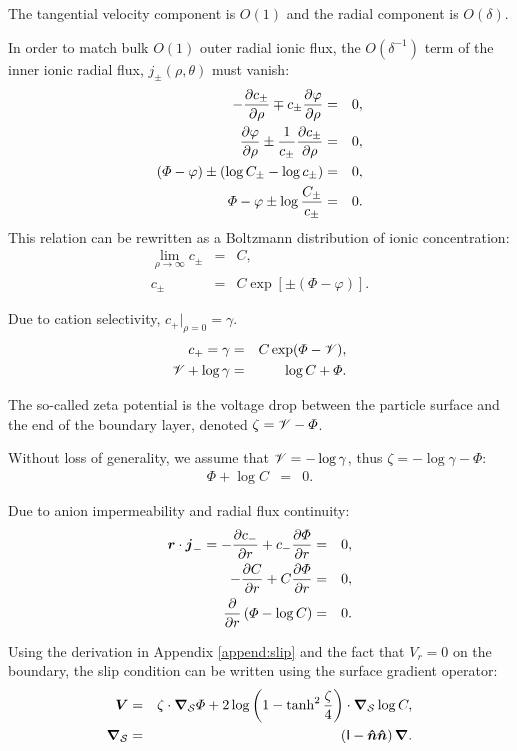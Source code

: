 The tangential velocity component is $O(1)$ and the radial component is $O(\delta)$.

In order to match bulk $O(1)$ outer radial ionic flux, 
the $O(\delta^{-1})$ term of the inner ionic radial flux, $j_\pm(\rho, \theta)$ must vanish:
\begin{eqnarray}
  -\frac{\partial c_\pm}{\partial \rho} \mp c_\pm \frac{\partial \varphi}{\partial \rho} &=& 0, \\
  \frac{\partial \varphi}{\partial \rho} \pm\frac{1}{c_\pm}\frac{\partial c_\pm}{\partial \rho} &=& 0, \\
  \left(\varPhi - \varphi\right) \pm\left(\log C_\pm - \log c_\pm\right) &=& 0, \\
  \varPhi - \varphi \pm \log \frac{C_\pm}{c_\pm} &=& 0.
\end{eqnarray}
This relation can be rewritten as a Boltzmann distribution of ionic concentration:
\begin{eqnarray}
\lim_{\rho\rightarrow\infty} c_\pm &=& C, \\
c_\pm &=& C \exp\left[\pm(\varPhi - \varphi)\right].
\end{eqnarray}

Due to cation selectivity, $c_+|_{\rho=0} = \gamma$.
\begin{eqnarray}
  c_+ = \gamma &=& C \exp(\varPhi - \mathscr{V}), \\
  \mathscr{V} + \log \gamma &=& \log C + \varPhi.
\end{eqnarray}

The so-called zeta potential is 
the voltage drop between the particle surface and the end of
the boundary layer, denoted $\zeta = \mathscr{V} - \varPhi$. 

Without loss of generality, 
we assume that $\mathscr{V} = -\log\gamma$, thus $\zeta = -\log\gamma-\varPhi$:
\begin{eqnarray}
\varPhi + \log C &=& 0.
\end{eqnarray}

Due to anion impermeability and radial flux continuity:
\begin{eqnarray}
  \boldsymbol{r} \cdot \boldsymbol{j}_- = -\frac{\partial c_-}{\partial r} + c_- \frac{\partial \varPhi}{\partial r} &=& 0, \\
-\frac{\partial C}{\partial r} + C \frac{\partial \varPhi}{\partial r} &=& 0, \\
\frac{\partial }{\partial r}\left(\varPhi - \log C\right) &=& 0.
\end{eqnarray}

Using the derivation in Appendix \ref{append:slip} and the fact that $V_r = 0$ 
on the boundary, the slip condition can be written using the surface
gradient operator:
\begin{eqnarray}
\boldsymbol{V} &=& 
\zeta \cdot \boldsymbol{\nabla}_\mathcal{S} \varPhi 
+ 2\log\left(1-\tanh^2\frac{\zeta}{4}\right) \cdot \boldsymbol{\nabla}_\mathcal{S} \log C, \\
\boldsymbol{\nabla}_\mathcal{S} &=& \left(\mathsf{I} - \boldsymbol{\hat{n}}\boldsymbol{\hat{n}}\right) \boldsymbol{\nabla}.
\end{eqnarray}

